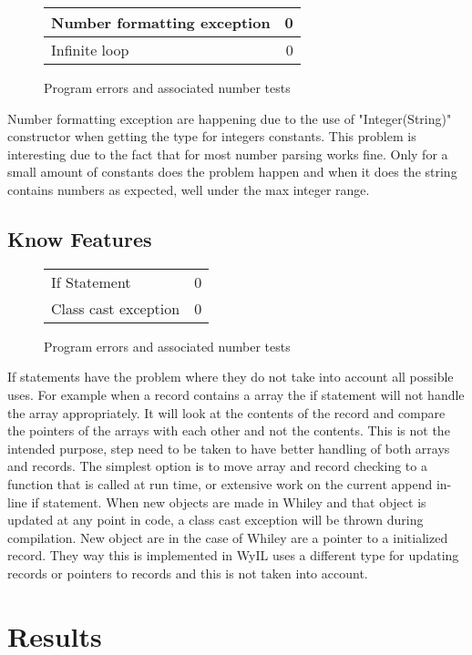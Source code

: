 \begin{figure}[H]
  \centering
  \begin{tabular}{| l || r |}
  \hline
  Number formatting exception & 0 \\ \hline
  Infinite loop & 0\\ \hline
  \hline
  \end{tabular}
  \caption{Program errors and associated number tests}
  \label{fig:table2}
\end{figure}

Number formatting exception are happening due to the use of "Integer(String)" constructor when getting the type for integers constants. This problem is interesting due to the fact that for most number parsing works fine. Only for a small amount of constants does the problem happen and when it does the string contains numbers as expected, well under the max integer range. %


\subsection{Know Features}

\begin{figure}[H]
  \centering
  \begin{tabular}{| l || r |}
  \hline
  If Statement & 0 \\
  Class cast exception & 0 \\ \hline 
  \hline
  \end{tabular}
  \caption{Program errors and associated number tests}
  \label{fig:table2}
\end{figure}

If statements have the problem where they do not take into account all possible uses. For example when a record contains a array the if statement will not handle the array appropriately. It will look at the contents of the record and compare the pointers of the arrays with each other and not the contents. This is not the intended purpose, step need to be taken to have better handling of both arrays and records. The simplest option is to move array and record checking to a function that is called at run time, or extensive work on the current append in-line if statement. 
When new objects are made in Whiley and that object is updated at any point in code, a class cast exception will be thrown during compilation. New object are in the case of Whiley are a pointer to a initialized record. They way this is implemented in WyIL uses a different type for updating records or pointers to records and this is not taken into account. 

\section{Results}




